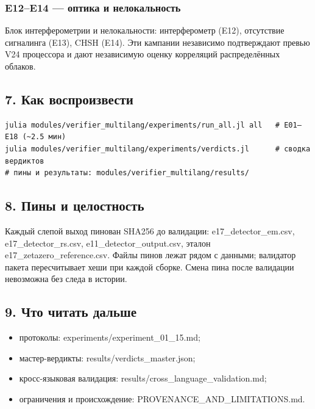 \documentclass[11pt,a4paper]{article}
\begin{document}
\subsubsection{E12–E14 — оптика и нелокальность}

Блок интерферометрии и нелокальности: интерферометр (E12), отсутствие сигналинга (E13), CHSH (E14). Эти кампании независимо подтверждают превью V24 процессора и дают независимую оценку корреляций распределённых облаков.

\subsection{7. Как воспроизвести}

\begin{verbatim}
julia modules/verifier_multilang/experiments/run_all.jl all   # E01–E18 (~2.5 мин)
julia modules/verifier_multilang/experiments/verdicts.jl      # сводка вердиктов
# пины и результаты: modules/verifier_multilang/results/
\end{verbatim}

\subsection{8. Пины и целостность}

Каждый слепой выход пинован SHA256 до валидации: e17\_detector\_em.csv, e17\_detector\_rs.csv, e11\_detector\_output.csv, эталон e17\_zetazero\_reference.csv. Файлы пинов лежат рядом с данными; валидатор пакета пересчитывает хеши при каждой сборке. Смена пина после валидации невозможна без следа в истории.

\subsection{9. Что читать дальше}

\begin{itemize}
  \item протоколы: experiments/experiment\_01\_15.md;
  \item мастер-вердикты: results/verdicts\_master.json;
  \item кросс-языковая валидация: results/cross\_language\_validation.md;
  \item ограничения и происхождение: PROVENANCE\_AND\_LIMITATIONS.md.
\end{itemize}
\end{document}
